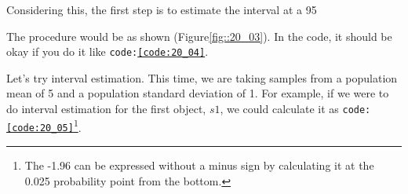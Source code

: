\documentclass{ltjsbook}
\begin{document}
Considering this, the first step is to estimate the interval at a 95%

The procedure would be as shown (Figure\ref{fig::20_03}). In the code, it should be okay if you do it like \texttt{code:\ref{code:20_04}}.



Let's try interval estimation. This time, we are taking samples from a population mean of 5 and a population standard deviation of 1. For example, if we were to do interval estimation for the first object, $s1$, we could calculate it as \texttt{code:\ref{code:20_05}}\footnote{The -1.96 can be expressed without a minus sign by calculating it at the 0.025 probability point from the bottom.}.


\end{document}
